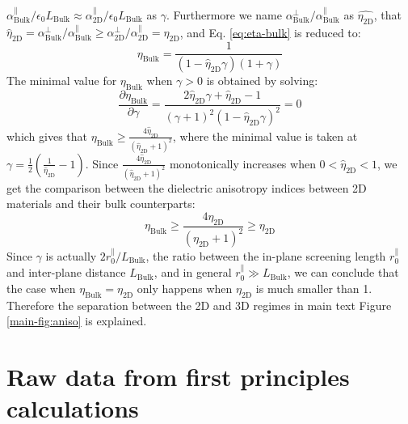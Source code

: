 \documentclass[manuscript=suppinfo,email=true,hyperref=true,keywords=false]{achemso}
\begin{document}
$\alpha_{\mathrm{Bulk}}^{\parallel} /\epsilon_{0}L_{\mathrm{Bulk}}
\approx \alpha_{\mathrm{2D}}^{\parallel}/
\epsilon_{0}L_{\mathrm{Bulk}}$ as $\gamma$. Furthermore we name
$\alpha_{\mathrm{Bulk}}^{\perp}/\alpha_{\mathrm{Bulk}}^{\parallel}$ as
$\hat{\eta_{\mathrm{2D}}}$, that
$\hat{\eta}_{\mathrm{2D}} =
\alpha_{\mathrm{Bulk}}^{\perp}/\alpha_{\mathrm{Bulk}}^{\parallel} \geq
\alpha_{\mathrm{2D}}^{\perp}/\alpha_{\mathrm{2D}}^{\parallel}=\eta_{\mathrm{2D}}$,
and Eq. \ref{eq:eta-bulk} is reduced to:
\begin{equation}
  \label{eq:eta-bulk-2}
  \eta_{\mathrm{Bulk}} = \frac{1}{(1 - \hat{\eta}_{\mathrm{2D}} \gamma) (1 + \gamma)}
\end{equation}
The minimal value for $\eta_{\mathrm{Bulk}}$ when $\gamma>0$ is obtained by solving:
\begin{equation}
  \label{eq:eta-bulk-min}
  \frac{\partial \eta_{\mathrm{Bulk}}}{\partial \gamma}
  = \frac{2 \hat{\eta}_{\mathrm{2D}} \gamma + \hat{\eta}_{\mathrm{2D}} - 1}
  {(\gamma+1)^{2}(1 - \hat{\eta}_{\mathrm{2D}} \gamma)^{2}} = 0
\end{equation}
which gives that
$\eta_{\mathrm{Bulk}} \geq \frac{4
  \hat{\eta}_{\mathrm{2D}}}{(\hat{\eta}_{\mathrm{2D}} + 1)^{2}}$,
where the minimal value is taken at
$\gamma = \frac{1}{2}(\frac{1}{\hat{\eta}_{\mathrm{2D}}} - 1)$. Since
$\frac{4 \hat{\eta}_{\mathrm{2D}}}{(\hat{\eta}_{\mathrm{2D}} +
  1)^{2}}$ monotonically increases when
$0 < \hat{\eta}_{\mathrm{2D}} < 1$, we get the comparison between the
dielectric anisotropy indices between 2D materials and their bulk
counterparts:
\begin{equation}
  \label{eq:aniso-final}
\eta_{\mathrm{Bulk}} \geq \frac{4
  \eta_{\mathrm{2D}}}{(\eta_{\mathrm{2D}} + 1)^{2}} \geq
\eta_{\mathrm{2D}} 
\end{equation}
Since $\gamma$ is actually $2r_{0}^{\parallel}/L_{\mathrm{Bulk}}$, the
ratio between the in-plane screening length $r_{0}^{\parallel}$ and
inter-plane distance $L_{\mathrm{Bulk}}$, and in general
$r_{0}^{\parallel} \gg L_{\mathrm{Bulk}}$, we can conclude that the
case when $\eta_{\mathrm{Bulk}} = \eta_{\mathrm{2D}}$ only happens
when $\eta_{\mathrm{2D}}$ is much smaller than 1. Therefore the
separation between the 2D and 3D regimes in main text Figure
\ref{main-fig:aniso} is explained.







\section{Raw data from first principles calculations}
\label{sec:raw}
\end{document}
